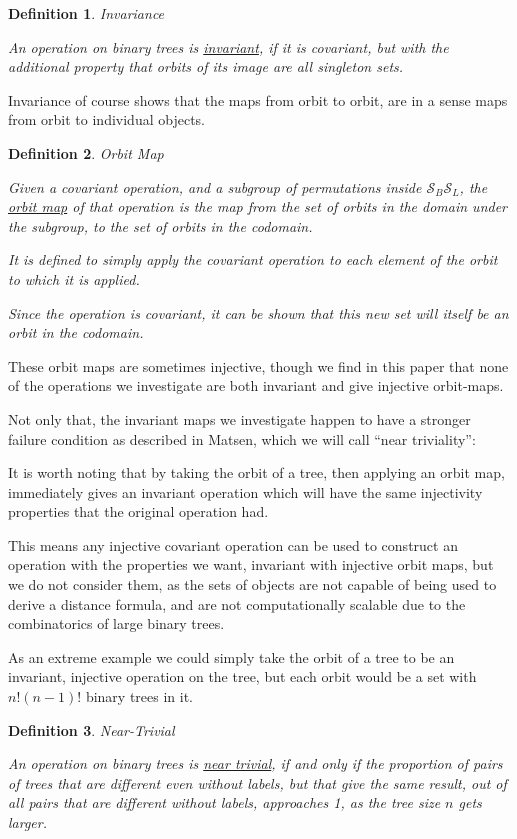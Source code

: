 \documentclass[10pt,a4paper]{report}
\newcommand{\Sym}{\mathcal{S}}
\newtheorem{definition}{Definition}
\begin{document}
\begin{definition} Invariance

	An operation on binary trees is \underline{invariant}, if it is covariant,
	but with the additional property that orbits of its image are all singleton
	sets.
\end{definition}

Invariance of course shows that the maps from orbit to orbit, are in a sense
maps from orbit to individual objects.

\begin{definition} Orbit Map

	Given a covariant operation, and a subgroup of permutations inside
	$\Sym_B\Sym_L$, the \underline{orbit map} of that operation is the map from the set
	of orbits in the domain under the subgroup, to the set of orbits in the
	codomain.

	It is defined to simply apply the covariant operation to each element of
	the orbit to which it is applied.

	Since the operation is covariant, it can be shown that this new set will
	itself be an orbit in the codomain.
\end{definition}

These orbit maps are sometimes injective, though we find in this paper that
none of the operations we investigate are both invariant and give injective
orbit-maps.

Not only that, the invariant maps we investigate happen to have a stronger
failure condition as described in Matsen, which we will call ``near
triviality'':


It is worth noting that by taking the orbit of a tree, then applying an orbit map, immediately gives an invariant operation which will have the same injectivity properties that the original operation had.

This means any injective covariant operation can be used to construct an operation with the properties we want, invariant with injective orbit maps, but we do not consider them, as the sets of objects are not capable of being used to derive a distance formula, and are not computationally scalable due to the combinatorics of large binary trees.

As an extreme example we could simply take the orbit of a tree to be an invariant, injective operation on the tree, but each orbit would be a set with $n!(n-1)!$ binary trees in it.

\begin{definition} Near-Trivial

	An operation on binary trees is \underline{near trivial}, if and only if the proportion
	of pairs of trees that are different even without labels, but that give the same result,
	out of all pairs that are different without labels, approaches 1, as the tree
	size $n$ gets larger.
\end{definition}
\end{document}
